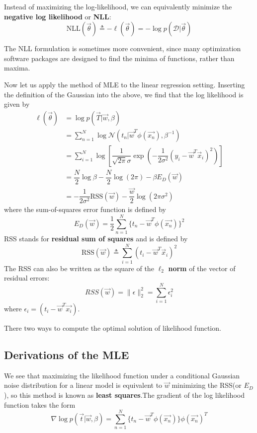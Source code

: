 Instead of maximizing the log-likelihood, we can equivalently minimize the \textbf{negative log likelihood} or \textbf{NLL}:
\begin{equation}
\text{NLL}(\vec{\theta}) \triangleq -\ell(\vec{\theta})=-\log p(\mathcal{D}|\vec{\theta})
\end{equation}

The NLL formulation is sometimes more convenient, since many optimization software packages are designed to find the minima of functions, rather than maxima.

Now let us apply the method of MLE to the linear regression setting. Inserting the definition of the Gaussian into the above, we find that the log likelihood is given by
\begin{align}
\ell(\vec{\theta}) &= \log p(\vec{T}|\vec{w},\beta) \\
&=\sum_{n=1}^{N}\log \mathcal{N}(t_n|\vec{w}^T\phi(\vec{x_n}),\beta^{-1}) \\
&=\sum\limits_{i=1}^N \log\left[\dfrac{1}{\sqrt{2\pi}\sigma}\exp\left(-\dfrac{1}{2\sigma^2}(y_i-\vec{w}^T\vec{x}_i)^2\right)\right] \\
&=\dfrac{N}{2}\log \beta-\dfrac{N}{2}\log (2\pi)-\beta E_D(\vec{w}) \\
&=-\dfrac{1}{2\sigma^2}\text{RSS}(\vec{w})-\dfrac{\vec{w}}{2}\log(2\pi\sigma^2)
\end{align}
where the sum-of-squares error function is defined by
\begin{equation}
E_D(\vec{w}) =
\dfrac{1}{2}\sum_{n=1}^{N}\{t_n-\vec{w}^T\phi(\vec{x_n}) \}^2
\end{equation}
RSS stands for \textbf{residual sum of squares} and is defined by
\begin{equation}
\text{RSS}(\vec{w}) \triangleq \sum\limits_{i=1}^N (t_i-\vec{w}^T\vec{x}_i)^2
\end{equation}
The RSS can also be written as the square of the $\ell_2$ \textbf{norm} of the vector of residual errors:
\begin{equation}
RSS(\vec{w}) = \parallel\epsilon\parallel_2^2 = \sum_{i=1}^{N}\epsilon_i^2
\end{equation}
where $\epsilon_i = (t_i - \vec{w}^T\vec{x_i})$.

There two ways to compute the optimal solution of likelihood function.

\subsection{Derivations of the MLE}
We see that maximizing the likelihood function under a conditional Gaussian noise distribution for a linear model is equivalent to $\vec{w}$ minimizing the RSS(or $E_D$), so this method is known as \textbf{least squares}.The gradient of the log likelihood function takes the form
\begin{equation}
\nabla\log p(\vec{t}|\vec{w},\beta)
=\sum_{n=1}^{N}\{t_n-\vec{w}^T\phi(\vec{x_n}) \}\phi(\vec{x_n})^T
\end{equation}

